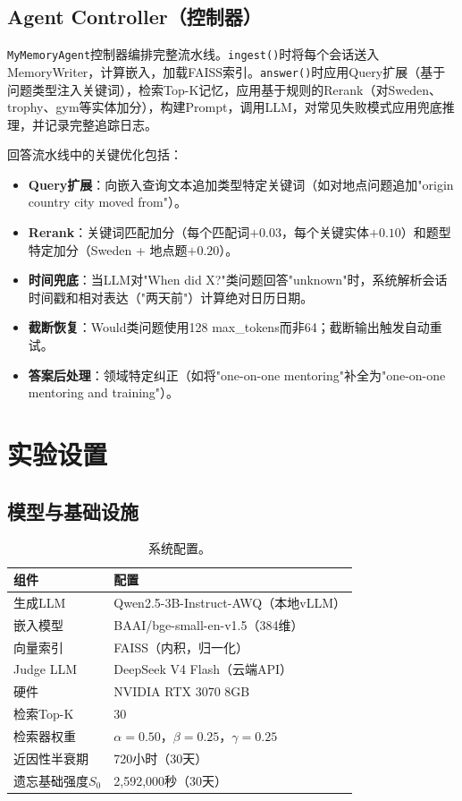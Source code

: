 \documentclass[11pt,a4paper]{ctexart}
\begin{document}
\subsection{Agent Controller（控制器）}

\texttt{MyMemoryAgent}控制器编排完整流水线。\texttt{ingest()}时将每个会话送入MemoryWriter，计算嵌入，加载FAISS索引。\texttt{answer()}时应用Query扩展（基于问题类型注入关键词），检索Top-K记忆，应用基于规则的Rerank（对Sweden、trophy、gym等实体加分），构建Prompt，调用LLM，对常见失败模式应用兜底推理，并记录完整追踪日志。

回答流水线中的关键优化包括：

\begin{itemize}[nosep]
    \item \textbf{Query扩展}：向嵌入查询文本追加类型特定关键词（如对地点问题追加"origin country city moved from"）。
    \item \textbf{Rerank}：关键词匹配加分（每个匹配词$+0.03$，每个关键实体$+0.10$）和题型特定加分（Sweden + 地点题$+0.20$）。
    \item \textbf{时间兜底}：当LLM对"When did X?"类问题回答"unknown"时，系统解析会话时间戳和相对表达（"两天前"）计算绝对日历日期。
    \item \textbf{截断恢复}：Would类问题使用128 max\_tokens而非64；截断输出触发自动重试。
    \item \textbf{答案后处理}：领域特定纠正（如将"one-on-one mentoring"补全为"one-on-one mentoring and training"）。
\end{itemize}

\section{实验设置}

\subsection{模型与基础设施}

\begin{table}[H]
\centering
\begin{tabular}{@{}ll@{}}
\toprule
\textbf{组件} & \textbf{配置} \\
\midrule
生成LLM & Qwen2.5-3B-Instruct-AWQ（本地vLLM） \\
嵌入模型 & BAAI/bge-small-en-v1.5（384维） \\
向量索引 & FAISS（内积，归一化） \\
Judge LLM & DeepSeek V4 Flash（云端API） \\
硬件 & NVIDIA RTX 3070 8GB \\
\midrule
检索Top-K & 30 \\
检索器权重 & $\alpha{=}0.50$，$\beta{=}0.25$，$\gamma{=}0.25$ \\
近因性半衰期 & 720小时（30天） \\
遗忘基础强度$S_0$ & 2,592,000秒（30天） \\
\bottomrule
\end{tabular}
\caption{系统配置。}
\label{tab:config}
\end{table}
\end{document}

